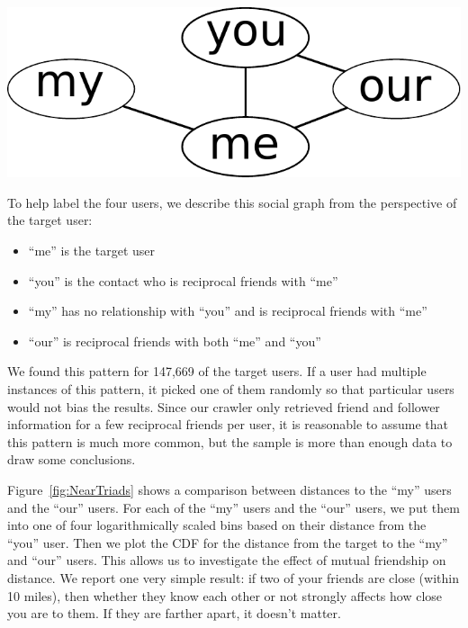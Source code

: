 \begin{center}
\includegraphics[width=0.3\linewidth]{figures/near_triads_dia.pdf}
\end{center}

To help label the four users, we describe this social graph from the
perspective of the target user:

\begin{itemize}
\item ``me'' is the target user
\item ``you'' is the contact who is reciprocal friends with ``me''
\item ``my'' has no relationship with ``you'' and is reciprocal friends with ``me''
\item ``our'' is reciprocal friends with both ``me'' and ``you''
\end{itemize}

We found this pattern for 147,669 of the target users.
%
If a user had multiple instances of this pattern, it picked one of them
randomly so that particular users would not bias the results.
%
Since our crawler only retrieved friend and follower information for a few
reciprocal friends per user, it is reasonable to assume that this pattern
is much more common, but the sample is more than enough data to draw some
conclusions.

Figure~\ref{fig:NearTriads} shows a comparison between distances to the ``my''
users and the ``our'' users.
%
For each of the ``my'' users and the ``our'' users, we put them into one of
four logarithmically scaled bins based on their distance from the ``you'' user.
%
Then we plot the CDF for the distance from the target to the ``my'' and ``our'' users.
%
This allows us to investigate the effect of mutual friendship on distance.
We report one very simple result: if two of your friends are close (within 10
miles), then whether they know each other or not strongly affects how close
you are to them.
%
If they are farther apart, it doesn't matter.


